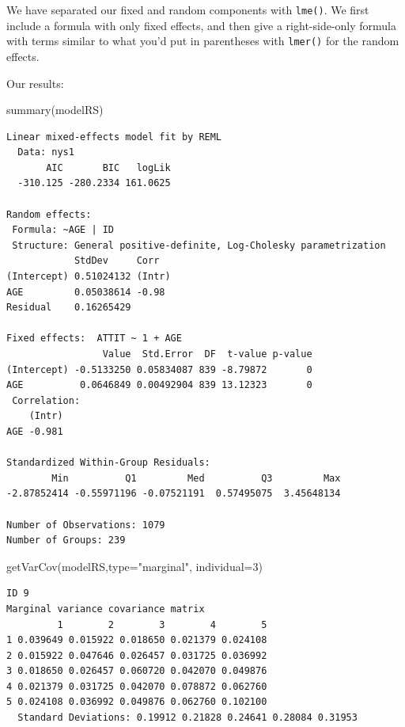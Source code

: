 \documentclass[
  letterpaper,
  DIV=11,
  numbers=noendperiod]{scrreprt}
\newenvironment{Shaded}{\begin{snugshade}}{\end{snugshade}}
\newcommand{\AttributeTok}[1]{\textcolor[rgb]{0.49,0.56,0.16}{#1}}
\newcommand{\DecValTok}[1]{\textcolor[rgb]{0.25,0.63,0.44}{#1}}
\newcommand{\FunctionTok}[1]{\textcolor[rgb]{0.02,0.16,0.49}{#1}}
\newcommand{\NormalTok}[1]{\textcolor[rgb]{0.00,0.44,0.13}{#1}}
\newcommand{\StringTok}[1]{\textcolor[rgb]{0.25,0.44,0.63}{#1}}
\begin{document}
We have separated our fixed and random components with \texttt{lme()}.
We first include a formula with only fixed effects, and then give a
right-side-only formula with terms similar to what you'd put in
parentheses with \texttt{lmer()} for the random effects.

Our results:

\begin{Shaded}
\begin{Highlighting}[]
\FunctionTok{summary}\NormalTok{(modelRS)}
\end{Highlighting}
\end{Shaded}

\begin{verbatim}
Linear mixed-effects model fit by REML
  Data: nys1 
       AIC       BIC   logLik
  -310.125 -280.2334 161.0625

Random effects:
 Formula: ~AGE | ID
 Structure: General positive-definite, Log-Cholesky parametrization
            StdDev     Corr  
(Intercept) 0.51024132 (Intr)
AGE         0.05038614 -0.98 
Residual    0.16265429       

Fixed effects:  ATTIT ~ 1 + AGE 
                 Value  Std.Error  DF  t-value p-value
(Intercept) -0.5133250 0.05834087 839 -8.79872       0
AGE          0.0646849 0.00492904 839 13.12323       0
 Correlation: 
    (Intr)
AGE -0.981

Standardized Within-Group Residuals:
        Min          Q1         Med          Q3         Max 
-2.87852414 -0.55971196 -0.07521191  0.57495075  3.45648134 

Number of Observations: 1079
Number of Groups: 239 
\end{verbatim}

\begin{Shaded}
\begin{Highlighting}[]
\FunctionTok{getVarCov}\NormalTok{(modelRS,}\AttributeTok{type=}\StringTok{"marginal"}\NormalTok{, }\AttributeTok{individual=}\DecValTok{3}\NormalTok{)}
\end{Highlighting}
\end{Shaded}

\begin{verbatim}
ID 9 
Marginal variance covariance matrix
         1        2        3        4        5
1 0.039649 0.015922 0.018650 0.021379 0.024108
2 0.015922 0.047646 0.026457 0.031725 0.036992
3 0.018650 0.026457 0.060720 0.042070 0.049876
4 0.021379 0.031725 0.042070 0.078872 0.062760
5 0.024108 0.036992 0.049876 0.062760 0.102100
  Standard Deviations: 0.19912 0.21828 0.24641 0.28084 0.31953 
\end{verbatim}
\end{document}
